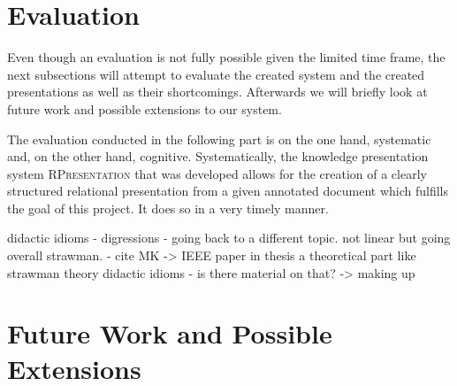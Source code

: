 \documentclass[twoside, 12pt]{article}
\newcommand{\sys}{\textsc{RPresentation}\xspace}
\begin{document}
\section{Evaluation}
\label{sec:eval}

Even though an evaluation is not fully possible given the limited time frame, the next subsections will attempt to evaluate the created system and the created presentations as well as their shortcomings. Afterwards we will briefly look at future work and possible extensions to our system.

The evaluation conducted in the following part is on the one hand, systematic and, on the other hand, cognitive. Systematically, the knowledge presentation system \sys that was developed allows for the creation of a clearly structured relational presentation from a given annotated document which fulfills the goal of this project. It does so in a very timely manner.





didactic idioms - digressions - going back to a different topic. 
not linear but going overall 
strawman. - cite MK -> IEEE paper
in thesis a theoretical part like strawman theory
didactic idioms - is there material on that? -> making up 


\section{Future Work and Possible Extensions}

\end{document}
